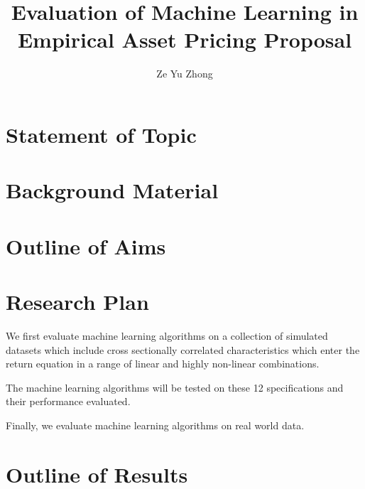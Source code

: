 \documentclass[man, a4paper, biblatex]{apa6}
\title{Evaluation of Machine Learning in Empirical Asset Pricing Proposal}
\author{Ze Yu Zhong}
\affiliation{Monash University}
\begin{document}
\maketitle


\section{Statement of Topic}

\section{Background Material}


\section{Outline of Aims}



\section{Research Plan}

We first evaluate machine learning algorithms on a collection of simulated datasets which include cross sectionally correlated characteristics which enter the return equation in a range of linear and highly non-linear combinations.

The machine learning algorithms will be tested on these 12 specifications and their performance evaluated.

Finally, we evaluate machine learning algorithms on real world data. 

\section{Outline of Results}
\end{document}
